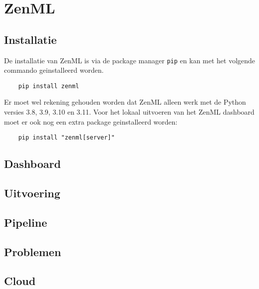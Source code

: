 \section{ZenML}
\subsection{Installatie}
De installatie van ZenML is via de package manager \verb+pip+ en kan met het volgende commando geinstalleerd worden.
\begin{verbatim}
    pip install zenml
\end{verbatim}
Er moet wel rekening gehouden worden dat ZenML alleen werk met de Python versies 3.8, 3.9, 3.10 en 3.11.
Voor het lokaal uitvoeren van het ZenML dashboard moet er ook nog een extra package geinstalleerd worden:
\begin{verbatim}
    pip install "zenml[server]"
\end{verbatim}
\subsection{Dashboard}
\subsection{Uitvoering}
\subsection{Pipeline}
\subsection{Problemen}
\subsection{Cloud}
